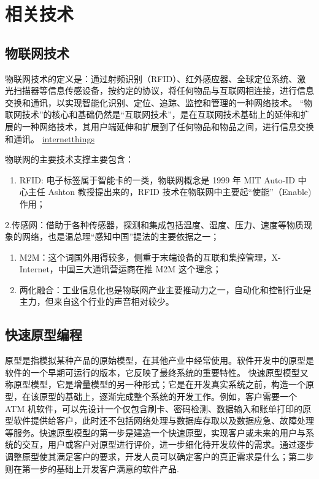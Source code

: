 \documentclass[doctor,secret]{thuthesis}
\begin{document}
\chapter{相关技术}
\label{sec:orgb46817f}
\section{物联网技术}
\label{sec:org794a93d}
物联网技术的定义是：通过射频识别（RFID）、红外感应器、全球定位系统、激光扫描器等信息传感设备，按约定的协议，将任何物品与互联网相连接，进行信息交换和通讯，以实现智能化识别、定位、追踪、监控和管理的一种网络技术。
“物联网技术”的核心和基础仍然是“互联网技术”，是在互联网技术基础上的延伸和扩展的一种网络技术，其用户端延伸和扩展到了任何物品和物品之间，进行信息交换和通讯。
\href{figures/internetofthings.pdf}{internetthings}

物联网的主要技术支撑主要包含：
\begin{enumerate}
\item RFID: 电子标签属于智能卡的一类，物联网概念是 1999 年 MIT Auto-ID 中心主任 Ashton 教授提出来的，RFID 技术在物联网中主要起“使能”（Enable)作用；
\end{enumerate}
2.传感网：借助于各种传感器，探测和集成包括温度、湿度、压力、速度等物质现象的网络，也是温总理“感知中国”提法的主要依据之一；
\begin{enumerate}
\item M2M：这个词国外用得较多，侧重于末端设备的互联和集控管理，X-Internet，中国三大通讯营运商在推 M2M 这个理念；
\item 两化融合：工业信息化也是物联网产业主要推动力之一，自动化和控制行业是主力，但来自这个行业的声音相对较少。
\end{enumerate}
\section{快速原型编程}
\label{sec:org20d59eb}
原型是指模拟某种产品的原始模型，在其他产业中经常使用。软件开发中的原型是软件的一个早期可运行的版本，它反映了最终系统的重要特性。
快速原型模型又称原型模型，它是增量模型的另一种形式；它是在开发真实系统之前，构造一个原型，在该原型的基础上，逐渐完成整个系统的开发工作。例如，客户需要一个 ATM 机软件，可以先设计一个仅包含刷卡、密码检测、数据输入和账单打印的原型软件提供给客户，此时还不包括网络处理与数据库存取以及数据应急、故障处理等服务。快速原型模型的第一步是建造一个快速原型，实现客户或未来的用户与系统的交互，用户或客户对原型进行评价，进一步细化待开发软件的需求。通过逐步调整原型使其满足客户的要求，开发人员可以确定客户的真正需求是什么；第二步则在第一步的基础上开发客户满意的软件产品.
\end{document}
